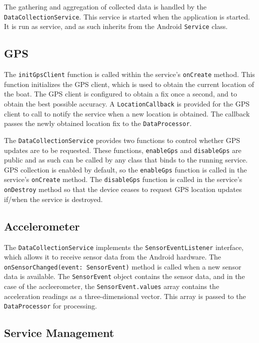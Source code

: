 \documentclass[11pt,twoside,a4paper]{report}
\begin{document}
The gathering and aggregation of collected data is handled by the \texttt{DataCollectionService}. This service is started when the application is started. It is run as service, and as such inherits from the Android \texttt{Service} class.

\subsection{GPS}

The \texttt{initGpsClient} function is called within the service's \texttt{onCreate} method. This function initializes the GPS client, which is used to obtain the current location of the boat. The GPS client is configured to obtain a fix once a second, and to obtain the best possible accuracy. A \texttt{LocationCallback} is provided for the GPS client to call to notify the service when a new location is obtained. The callback passes the newly obtained location fix to the \texttt{DataProcessor}.

The \texttt{DataCollectionService} provides two functions to control whether GPS updates are to be requested. These functions, \texttt{enableGps} and \texttt{disableGps} are public and as such can be called by any class that binds to the running service. GPS collection is enabled by default, so the \texttt{enableGps} function is called in the service's \texttt{onCreate} method. The \texttt{disableGps} function is called in the service's \texttt{onDestroy} method so that the device ceases to request GPS location updates if/when the service is destroyed.

\subsection{Accelerometer}

The \texttt{DataCollectionService} implements the \texttt{SensorEventListener} interface, which allows it to receive sensor data from the Android hardware. The \texttt{onSensorChanged(event: SensorEvent)} method is called when a new sensor data is available. The \texttt{SensorEvent} object contains the sensor data, and in the case of the accleerometer, the \texttt{SensorEvent.values} array contains the acceleration readings as a three-dimensional vector. This array is passed to the \texttt{DataProcessor} for processing.

\subsection{Service Management}
\end{document}
